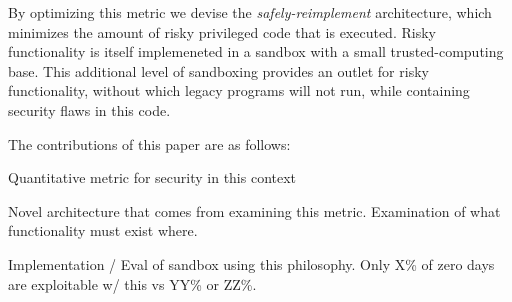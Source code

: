 By optimizing this metric   we devise the \emph{safely-reimplement}
architecture, which minimizes the amount of risky privileged code that is
executed.  
Risky functionality is itself implemeneted in a sandbox with
a small trusted-computing base.  
This additional level of sandboxing provides an outlet for risky functionality, without which
legacy programs will not run, while containing security flaws in this code.  

The contributions of this paper are as follows:

Quantitative metric for security in this context

Novel architecture that comes from examining this metric.  Examination of
what functionality must exist where.

Implementation / Eval of sandbox using this philosophy.  
Only X\% of zero days are exploitable w/ this vs YY\% or ZZ\%.



